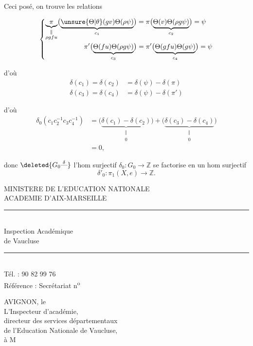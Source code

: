 Ceci posé, on trouve les relations


\[
\left\{\begin{aligned}\underbrace{\pi}_{\substack{\Vert\\\rho gfu}}\bigl(\underbrace{\unsure{\Theta|\theta}(gv)\Theta(\rho\psi)}_{c_1}\bigr)&=\pi\bigl(\underbrace{\Theta(v)\Theta(\rho g\psi)}_{c_2}\bigr)=\psi\\ \pi'\bigl(\underbrace{\Theta(fu)\Theta(\rho g\psi)}_{c_3}\bigr)&=\pi'\bigl(\underbrace{\Theta(gfu)\Theta(g\psi)}_{c_4}\bigr)=\psi\end{aligned}\right.
\]

d'où
\[
\begin{aligned}\delta(c_1)=\delta(c_2)&=\delta(\psi)-\delta(\pi)\\ \delta(c_3)=\delta(c_4)&=\delta(\psi)-\delta(\pi')\end{aligned}
\]

d'où
\[
\begin{aligned}\delta_0(c_1c_2^{-1}c_3c_4^{-1})&=\bigl(\underbrace{\delta(c_1)-\delta(c_2)}_{\substack{\Vert\\0}}\bigr)+\bigl(\underbrace{\delta(c_3)-\delta(c_4)}_{\substack{\Vert\\0}}\bigr)\\ &=0,\end{aligned}
\]

donc $\deleted{G_0\overset{\delta}{\text{---}}}$ l'hom surjectif $\delta_0:G_0\longrightarrow\mathbb Z$ se factorise en un hom surjectif
\[
\delta'_0:\pi_1(X,e)\longrightarrow\mathbb Z.
\]
\par\smallskip
{\footnotesize\noindent\begin{minipage}[t]{.46\linewidth}\raggedright
MINISTERE DE L'EDUCATION NATIONALE\\ ACADEMIE D'AIX-MARSEILLE\\ \rule{2.6em}{.3pt}\\ Inspection Académique\\ de Vaucluse\\ \rule{2.6em}{.3pt}\\ Tél. : 90 82 99 76\\ Référence : Secrétariat n\textsuperscript{o}
\end{minipage}\hfill%
\begin{minipage}[t]{.51\linewidth}\raggedright
AVIGNON, le\\ L'Inspecteur d'académie,\\ directeur des services départementaux\\ de l'Education Nationale de Vaucluse,\\ à M
\end{minipage}\par}

